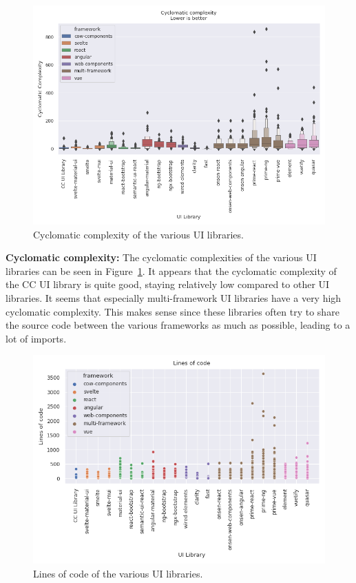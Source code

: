 \begin{figure}[h]
	\includegraphics[width=\columnwidth]{plots/cyclomatic-complexity.png}
	\caption{Cyclomatic complexity of the various UI libraries.}
	\label{fig:results:cyclomatic-complexity}
	\centering
\end{figure}

\textbf{Cyclomatic complexity:} The cyclomatic complexities of the various UI libraries can be seen in Figure~\ref{fig:results:cyclomatic-complexity}. It appears that the cyclomatic complexity of the CC UI library is quite good, staying relatively low compared to other UI libraries. It seems that especially multi-framework UI libraries have a very high cyclomatic complexity. This makes sense since these libraries often try to share the source code between the various frameworks as much as possible, leading to a lot of imports.

\begin{figure}[h]
	\includegraphics[width=\columnwidth]{plots/lines-of-code.png}
	\caption{Lines of code of the various UI libraries.}
	\label{fig:results:lines-of-code}
	\centering
\end{figure}

